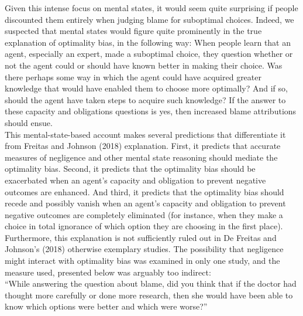 \documentclass[
  man,floatsintext]{apa6}
\begin{document}
Given this intense focus on mental states, it would seem quite surprising if people discounted them entirely when judging blame for suboptimal choices. Indeed, we suspected that mental states would figure quite prominently in the true explanation of optimality bias, in the following way: When people learn that an agent, especially an expert, made a suboptimal choice, they question whether or not the agent could or should have known better in making their choice. Was there perhaps some way in which the agent could have acquired greater knowledge that would have enabled them to choose more optimally? And if so, should the agent have taken steps to acquire such knowledge? If the answer to these capacity and obligations questions is yes, then increased blame attributions should ensue.\\
This mental-state-based account makes several predictions that differentiate it from Freitas and Johnson (2018) explanation. First, it predicts that accurate measures of negligence and other mental state reasoning should mediate the optimality bias. Second, it predicts that the optimality bias should be exacerbated when an agent's capacity and obligation to prevent negative outcomes are enhanced. And third, it predicts that the optimality bias should recede and possibly vanish when an agent's capacity and obligation to prevent negative outcomes are completely eliminated (for instance, when they make a choice in total ignorance of which option they are choosing in the first place).\\
Furthermore, this explanation is not sufficiently ruled out in De Freitas and Johnson's (2018) otherwise exemplary studies. The possibility that negligence might interact with optimality bias was examined in only one study, and the measure used, presented below was arguably too indirect:\\
``While answering the question about blame, did you think that if the doctor had thought more carefully or done more research, then she would have been able to know which options were better and which were worse?''\\
\end{document}
